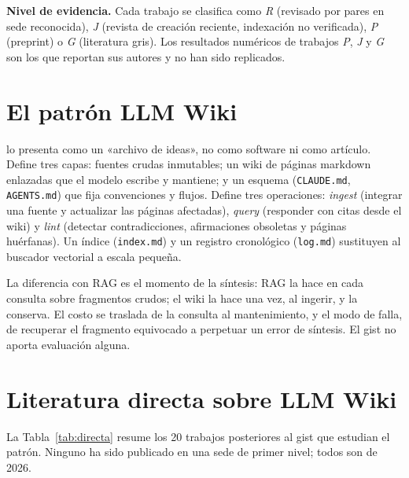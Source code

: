 \documentclass[11pt,letterpaper]{article}
\begin{document}
\textbf{Nivel de evidencia.} Cada trabajo se clasifica como \emph{R} (revisado por pares en sede reconocida), \emph{J} (revista de creación reciente, indexación no verificada), \emph{P} (preprint) o \emph{G} (literatura gris). Los resultados numéricos de trabajos \emph{P}, \emph{J} y \emph{G} son los que reportan sus autores y no han sido replicados.

\section{El patrón LLM Wiki}

\citet{karpathy2026} lo presenta como un «archivo de ideas», no como software ni como artículo. Define tres capas: fuentes crudas inmutables; un wiki de páginas markdown enlazadas que el modelo escribe y mantiene; y un esquema (\texttt{CLAUDE.md}, \texttt{AGENTS.md}) que fija convenciones y flujos. Define tres operaciones: \emph{ingest} (integrar una fuente y actualizar las páginas afectadas), \emph{query} (responder con citas desde el wiki) y \emph{lint} (detectar contradicciones, afirmaciones obsoletas y páginas huérfanas). Un índice (\texttt{index.md}) y un registro cronológico (\texttt{log.md}) sustituyen al buscador vectorial a escala pequeña.

La diferencia con RAG \citep{lewis2020} es el momento de la síntesis: RAG la hace en cada consulta sobre fragmentos crudos; el wiki la hace una vez, al ingerir, y la conserva. El costo se traslada de la consulta al mantenimiento, y el modo de falla, de recuperar el fragmento equivocado a perpetuar un error de síntesis. El gist no aporta evaluación alguna.

\section{Literatura directa sobre LLM Wiki}

La Tabla~\ref{tab:directa} resume los 20 trabajos posteriores al gist que estudian el patrón. Ninguno ha sido publicado en una sede de primer nivel; todos son de 2026.
\end{document}
